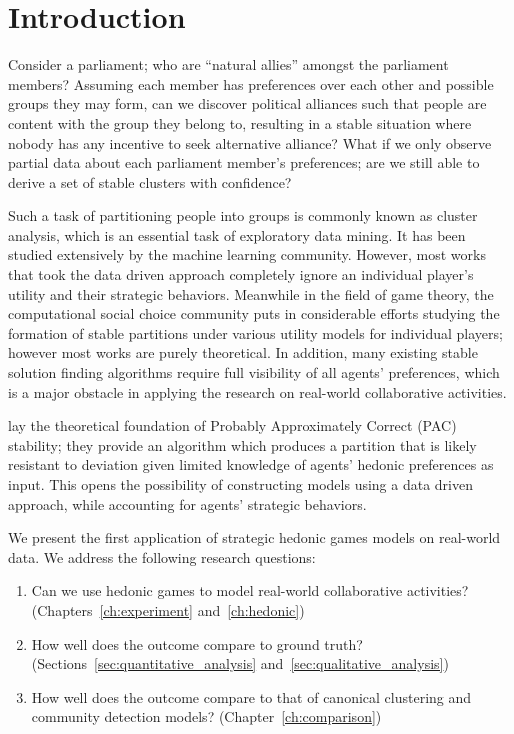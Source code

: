 
\chapter{Introduction}
\label{ch:intro}

Consider a parliament; who are ``natural allies'' amongst the parliament members?
Assuming each member has preferences over each other and possible groups they may
form, can we discover political alliances such that people are content with the 
group they belong to, resulting in a stable situation where nobody has any
incentive to seek alternative alliance?
What if we only observe partial data about each parliament member's preferences;
are we still able to derive a set of stable clusters with confidence? 

Such a task of partitioning people into groups is commonly known as cluster
analysis, which is an essential task of exploratory data mining.
It has been studied extensively by the machine learning community.
However, most works that took the data driven approach completely ignore an
individual player's utility and their strategic behaviors.
Meanwhile in the field of game theory, the computational social choice
community puts in considerable efforts studying the formation of stable
partitions under various utility models for individual players; however most
works are purely theoretical.
In addition, many existing stable solution finding algorithms require full
visibility of all agents' preferences, which is a major obstacle in applying
the research on real-world collaborative activities.

 lay the theoretical foundation of Probably
Approximately Correct (PAC) stability; they provide an algorithm which
produces a partition that is likely resistant to deviation given limited
knowledge of agents' hedonic preferences as input.  
This opens the possibility of constructing models using a data driven
approach, while accounting for agents' strategic behaviors.

We present the first application of strategic hedonic games models on
real-world data.
We address the following research questions:
\begin{enumerate}
    \item Can we use hedonic games to model real-world collaborative
      activities? (Chapters~\ref{ch:experiment} and~\ref{ch:hedonic})
    \item How well does the outcome compare to ground truth?
      (Sections~\ref{sec:quantitative_analysis}
      and~\ref{sec:qualitative_analysis})
    \item How well does the outcome compare to that of canonical clustering
      and community detection models? (Chapter~\ref{ch:comparison})
\end{enumerate}

